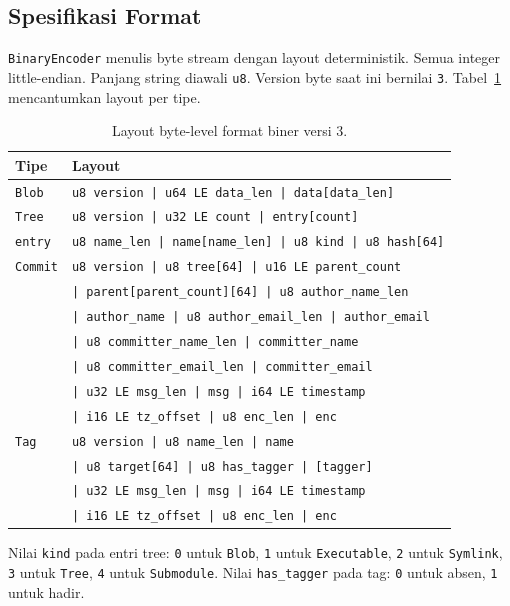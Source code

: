 \documentclass[11pt,a4paper]{article}
\begin{document}
\subsection{Spesifikasi Format}

\texttt{BinaryEncoder} menulis byte stream dengan layout deterministik. Semua integer little-endian. Panjang string diawali \texttt{u8}. Version byte saat ini bernilai \texttt{3}. Tabel~\ref{tab:format} mencantumkan layout per tipe.

\begin{table}[H]
	\centering
	\caption{Layout byte-level format biner versi 3.}
	\label{tab:format}
	\footnotesize
	\begin{tabularx}{\textwidth}{l X}
		\toprule
		Tipe & Layout \\
		\midrule
		\texttt{Blob} & \texttt{u8 version | u64 LE data\_len | data[data\_len]} \\
		\texttt{Tree} & \texttt{u8 version | u32 LE count | entry[count]} \\
		\texttt{entry} & \texttt{u8 name\_len | name[name\_len] | u8 kind | u8 hash[64]} \\
		\texttt{Commit} & \texttt{u8 version | u8 tree[64] | u16 LE parent\_count} \\
		 & \texttt{| parent[parent\_count][64] | u8 author\_name\_len} \\
		 & \texttt{| author\_name | u8 author\_email\_len | author\_email} \\
		 & \texttt{| u8 committer\_name\_len | committer\_name} \\
		 & \texttt{| u8 committer\_email\_len | committer\_email} \\
		 & \texttt{| u32 LE msg\_len | msg | i64 LE timestamp} \\
		 & \texttt{| i16 LE tz\_offset | u8 enc\_len | enc} \\
		\texttt{Tag} & \texttt{u8 version | u8 name\_len | name} \\
		 & \texttt{| u8 target[64] | u8 has\_tagger | [tagger]} \\
		 & \texttt{| u32 LE msg\_len | msg | i64 LE timestamp} \\
		 & \texttt{| i16 LE tz\_offset | u8 enc\_len | enc} \\
		\bottomrule
	\end{tabularx}
\end{table}

Nilai \texttt{kind} pada entri tree: \texttt{0} untuk \texttt{Blob}, \texttt{1} untuk \texttt{Executable}, \texttt{2} untuk \texttt{Symlink}, \texttt{3} untuk \texttt{Tree}, \texttt{4} untuk \texttt{Submodule}. Nilai \texttt{has\_tagger} pada tag: \texttt{0} untuk absen, \texttt{1} untuk hadir.
\end{document}

